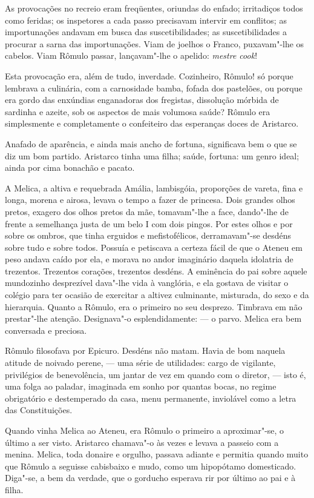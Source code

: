As provocações no recreio eram freqüentes, oriundas do
enfado; irritadiços todos como feridas; os inspetores a cada passo
precisavam intervir em conflitos; as importunações andavam em busca das
suscetibilidades; as suscetibilidades a procurar a sarna das
importunações. Viam de joelhos o Franco, puxavam"-lhe os cabelos. Viam
Rômulo passar, lançavam"-lhe o apelido: \textit{mestre cook}! 

Esta provocação
era, além de tudo, inverdade. Cozinheiro, Rômulo! só porque lembrava a
culinária, com a carnosidade bamba, fofada dos pastelões, ou porque era
gordo das enxúndias enganadoras dos fregistas, dissolução mórbida de
sardinha e azeite, sob os aspectos de mais volumosa saúde? Rômulo era
simplesmente e completamente o confeiteiro das esperanças doces de
Aristarco. 

Anafado de aparência, e ainda mais ancho de fortuna,
significava bem o que se diz um bom partido. Aristarco tinha uma filha;
saúde, fortuna: um genro ideal; ainda por cima bonachão e pacato. 

A Melica, a altiva e requebrada Amália, lambisgóia, proporções de vareta,
fina e longa, morena e airosa, levava o tempo a fazer de princesa. Dois
grandes olhos pretos, exagero dos olhos pretos da mãe, tomavam"-lhe a
face, dando"-lhe de frente a semelhança justa de um belo I com dois
pingos. Por estes olhos e por sobre os ombros, que tinha erguidos e
mefistofélicos, derramavam"-se desdéns sobre tudo e sobre todos.
Possuía e petiscava a certeza fácil de que o Ateneu em peso andava
caído por ela, e morava no andor imaginário daquela idolatria de trezentos. 
Trezentos corações, trezentos desdéns. A eminência do pai sobre aquele mundozinho
desprezível dava"-lhe vida à vanglória, e ela gostava de visitar o
colégio para ter ocasião de exercitar a altivez culminante, misturada,
do sexo e da hierarquia. Quanto a Rômulo, era o primeiro no seu
desprezo. Timbrava em não prestar"-lhe atenção. Designava"-o
esplendidamente: --- o parvo. Melica era bem conversada e preciosa.

Rômulo filosofava por Epicuro. Desdéns não matam. Havia de bom naquela
atitude de noivado perene, --- uma série de utilidades: cargo de
vigilante, privilégios de benevolência, um jantar de vez em quando com
o diretor, --- isto é, uma folga ao paladar, imaginada em sonho por
quantas bocas, no regime obrigatório e destemperado da casa, menu
permanente, inviolável como a letra das Constituições. 

Quando vinha Melica ao Ateneu, era Rômulo o primeiro a aproximar"-se, 
o último a ser visto. Aristarco chamava"-o às vezes e levava a passeio com a
menina. Melica, toda donaire e orgulho, passava adiante e permitia
quando muito que Rômulo a seguisse cabisbaixo e mudo, como um
hipopótamo domesticado. Diga"-se, a bem da verdade, que o gorducho
esperava rir por último ao pai e à filha. 

